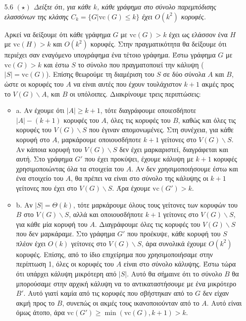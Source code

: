 \documentclass[a4paper, oneside, 11pt]{article}
\theoremstyle{definition}
\newcommand{\vc}{\text{vc}}
\begin{document}
\begin{enumerate}
	\item[5.6] \emph{$(\star)$ Δείξτε ότι, για κάθε $k$, κάθε γράφημα στο σύνολο παρεμπόδισης ελασσόνων της κλάσης $C_k=\{G|\vc(G)\leq k\}$ έχει $O(k^2)$ κορυφές.}

Αρκεί να δείξουμε ότι κάθε γράφημα $G$ με $\vc(G)>k$ έχει ως ελάσσον ένα $H$ με $\vc(H)>k$ και $O(k^2)$ κορυφές. Στην πραγματικότητα θα δείξουμε ότι περιέχει σαν εναγόμενο υπογράφημα ένα τέτοιο γράφημα.
Έστω γράφημα $G$ με $\vc(G)>k$ και έστω $S$ το σύνολο που πραγματοποιεί την κάλυψη ($|S|=\vc(G)$). Επίσης θεωρούμε τη διαμέριση του $S$ σε δύο σύνολα $A$ και $B$, ώστε οι κορυφές του $A$ να 
είναι αυτές που έχουν τουλάχιστον
$k+1$ ακμές προς το $V(G)\backslash A$, και $B$ οι υπόλοιπες. Διακρίνουμε τρεις περιπτώσεις: 
\begin{itemize}

\item{a.}
Αν έχουμε ότι $|A| \geq k+1$, τότε διαγράφουμε οποιεσδήποτε $|A|-(k+1)$ κορυφές του $A$, όλες τις κορυφές του $B$, καθώς και όλες τις κορυφές του 
$V(G)\backslash S$ που έγιναν απομονωμένες. Στη συνέχεια, για κάθε κορυφή στο $A$, μαρκάρουμε οποιουσδήποτε $k+1$ γείτονες στο $V(G)\backslash S$. Αν κάποια κορυφή του $V(G)\backslash S$ δεν έχει
μαρκαριστεί, διαγράφεται και αυτή. Στο γράφημα $G'$ 
που έχει προκύψει, έχουμε κάλυψη με $k+1$ κορυφές χρησιμοποιώντας όλα τα στοιχεία του $A$. Αν δεν χρησιμοποιήσουμε έστω και ένα στοιχείο του $A$,
θα πρέπει να είναι στο σύνολο της κάλυψης οι $k+1$ γείτονες που έχει στο $V(G)\backslash S$. Άρα έχουμε $\vc(G')>k$.

\item{b.}
Αν $|S|=\Theta(k)$, τότε μαρκάρουμε όλους τους γείτονες των κορυφών του $B$ στο $V(G)\backslash S$, αλλά και οποιουσδήποτε $k+1$ γείτονες στο $V(G)\backslash S$, για κάθε μία κορυφή του $A$.
Διαγράφουμε όλες τις κορυφές του $V(G)\backslash S$ που δεν μαρκάραμε.
Στο γράφημα $G'$ που προέκυψε, κάθε κορυφή του $S$ πλέον έχει $O(k)$ γείτονες στο $V(G)\backslash S$, άρα συνολικά έχουμε $O(k^2)$ κορυφές. Επίσης, από το ίδιο επιχείρημα που χρησιμοποιήσαμε στην
περίπτωση 1, όλες οι κορυφές του $A$ είναι στο σύνολο κάλυψης. Έστω τώρα ότι υπάρχει κάλυψη μικρότερη από $|S|$. Αυτό θα σήμαινε ότι το σύνολο $B$ θα μπορούσαμε στην αρχική κάλυψη να το
αντικαταστήσουμε με ένα μικρότερο $B'$. Αυτό γιατί καμία από τις κορυφές που σβήστηκαν από το $G$ δεν είχαν ακμή προς το $B$, συνεπώς οι ακμές τους ικανοποιούνταν από το $A$. Αυτό είναι όμως άτοπο,
άρα $\vc(G')\geq\min(\vc(G),k+1)>k$.


\end{itemize}
\end{enumerate}
\end{document}
